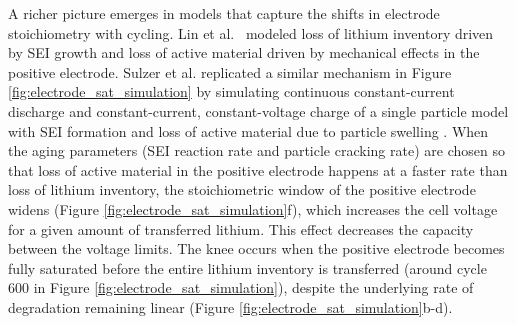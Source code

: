 \documentclass[journal=jpclcd,manuscript=article]{achemso}
\begin{document}

A richer picture emerges in models that capture the shifts in electrode stoichiometry with cycling. Lin et al.~\cite{lin_comprehensive_2013} modeled loss of lithium inventory driven by SEI growth and loss of active material driven by mechanical effects in the positive electrode. Sulzer et al.\cite{sulzer_accelerated_2021} replicated a similar mechanism in Figure \ref{fig:electrode_sat_simulation} by simulating continuous constant-current discharge and constant-current, constant-voltage charge of a single particle model with SEI formation \cite{yang_modeling_2017} and loss of active material \cite{reniers_review_2019, laresgoiti_modeling_2015} due to particle swelling \cite{ai_electrochemical_2020, mohtat_differential_2020}. When the aging parameters (SEI reaction rate and particle cracking rate) are chosen so that loss of active material in the positive electrode happens at a faster rate than loss of lithium inventory, the stoichiometric window of the positive electrode widens (Figure \ref{fig:electrode_sat_simulation}f), which increases the cell voltage for a given amount of transferred lithium. This effect decreases the capacity between the voltage limits. The knee occurs when the positive electrode becomes fully saturated before the entire lithium inventory is transferred (around cycle 600 in Figure \ref{fig:electrode_sat_simulation}), despite the underlying rate of degradation remaining linear (Figure \ref{fig:electrode_sat_simulation}b-d).
\end{document}
